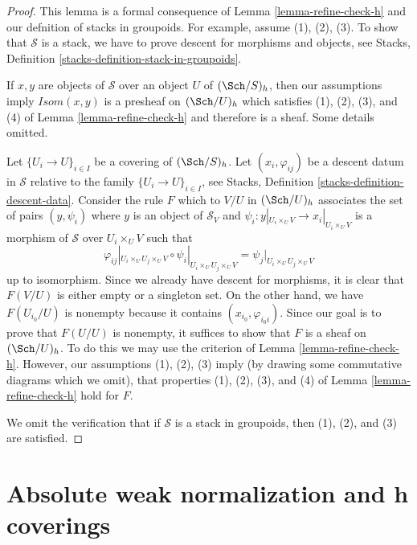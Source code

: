 \begin{proof}
This lemma is a formal consequence of Lemma \ref{lemma-refine-check-h}
and our defnition of stacks in groupoids.
For example, assume (1), (2), (3). To show that
$\mathcal{S}$ is a stack, we have
to prove descent for morphisms and objects, see
Stacks, Definition \ref{stacks-definition-stack-in-groupoids}.

\medskip\noindent
If $x, y$ are objects of $\mathcal{S}$ over an object $U$ of
$(\Sch/S)_h$, then our assumptions imply $\mathit{Isom}(x, y)$
is a presheaf on $(\Sch/U)_h$ which satisfies
(1), (2), (3), and (4) of Lemma \ref{lemma-refine-check-h}
and therefore is a sheaf. Some details omitted.

\medskip\noindent
Let $\{U_i \to U\}_{i \in I}$ be a covering of $(\Sch/S)_h$.
Let $(x_i, \varphi_{ij})$ be a descent datum in $\mathcal{S}$
relative to the family $\{U_i \to U\}_{i \in I}$, see
Stacks, Definition \ref{stacks-definition-descent-data}.
Consider the rule $F$ which to $V/U$ in $(\Sch/U)_h$ associates
the set of pairs $(y, \psi_i)$ where $y$ is an object of $\mathcal{S}_V$
and $\psi_i : y|_{U_i \times_U V} \to x_i|_{U_i \times_U V}$
is a morphism of $\mathcal{S}$ over $U_i \times_U V$
such that
$$
\varphi_{ij}|_{U_i \times_U U_j \times_U V}
\circ
\psi_i|_{U_i \times_U U_j \times_U V}
=
\psi_j|_{U_i \times_U U_j \times_U V}
$$
up to isomorphism. Since we already have descent for morphisms, it is
clear that $F(V/U)$ is either empty or a singleton set. On the other hand,
we have $F(U_{i_0}/U)$ is nonempty because it contains
$(x_{i_0}, \varphi_{i_0i})$. Since our goal is to prove that $F(U/U)$
is nonempty, it suffices to show that $F$ is a sheaf on $(\Sch/U)_h$.
To do this we may use the criterion of Lemma \ref{lemma-refine-check-h}.
However, our assumptions (1), (2), (3) imply (by drawing some
commutative diagrams which we omit), that properties (1), (2), (3), and (4)
of Lemma \ref{lemma-refine-check-h} hold for $F$.

\medskip\noindent
We omit the verification that if $\mathcal{S}$ is a stack in groupoids,
then (1), (2), and (3) are satisfied.
\end{proof}





\section{Absolute weak normalization and h coverings}
\label{section-h-and-weak-normalization}


